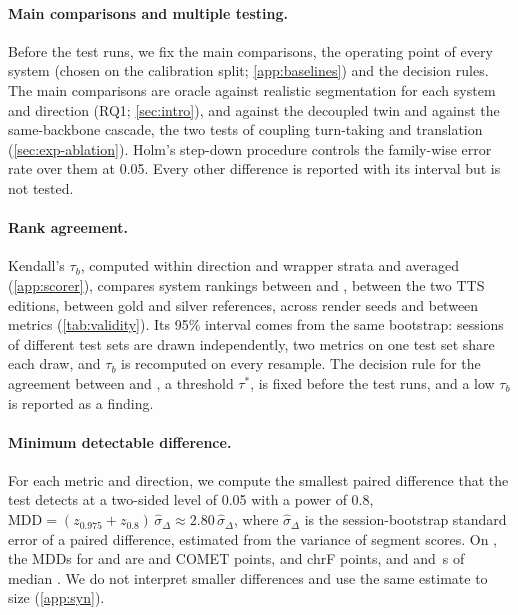 \paragraph{Main comparisons and multiple testing.}
Before the test runs, we fix the main comparisons, the operating point of every system (chosen on the \syn calibration split; \cref{app:baselines}) and the decision rules. The main comparisons are oracle against realistic segmentation for each system and direction (RQ1; \cref{sec:intro}), and \model against the decoupled twin and against the same-backbone cascade, the two tests of coupling turn-taking and translation (\cref{sec:exp-ablation}). Holm's step-down procedure \citep{holm1979simple} controls the family-wise error rate over them at 0.05. Every other difference is reported with its interval but is not tested.

\paragraph{Rank agreement.}
Kendall's $\tau_b$, computed within direction and wrapper strata and averaged (\cref{app:scorer}), compares system rankings between \taxi and \syn, between the two TTS editions, between gold and silver references, across render seeds and between metrics (\cref{tab:validity}). Its 95\% interval comes from the same bootstrap: sessions of different test sets are drawn independently, two metrics on one test set share each draw, and $\tau_b$ is recomputed on every resample. The decision rule for the agreement between \syn and \taxi, a threshold $\tau^\ast$, is fixed before the test runs, and a low $\tau_b$ is reported as a finding.

\paragraph{Minimum detectable difference.}
For each metric and direction, we compute the smallest paired difference that the test detects at a two-sided level of 0.05 with a power of 0.8, $\mathrm{MDD}=(z_{0.975}+z_{0.8})\,\hat\sigma_\Delta\approx2.80\,\hat\sigma_\Delta$, where $\hat\sigma_\Delta$ is the session-bootstrap standard error of a paired difference, estimated from the variance of \taxi segment scores. On \taxi, the MDDs for \ende and \deen are \tbdtext{} and \tbdtext{} COMET points, \tbdtext{} and \tbdtext{} chrF points, and \tbdtext{} and \tbdtext{}\,s of median \eo. We do not interpret smaller differences and use the same estimate to size \syn (\cref{app:syn}).

